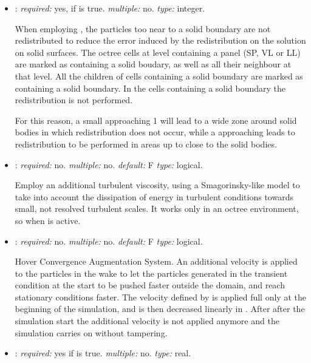 \begin{itemize}
\item {}: \textit{required:} yes, if  is true. \textit{multiple:} no. \textit{type:} integer.

When employing , the particles too near to a solid boundary are not redistributed to reduce the error induced by the redistribution on the solution on solid surfaces. The octree cells at level  containing a panel (SP, VL or LL) are marked as containing a solid boudary, as well as all their neighbour at that level. All the children of cells containing a solid boundary are marked as containing a solid boundary. In the cells containing a solid boundary the redistribution is not performed.

For this reason, a small  approaching 1 will lead to a wide zone around solid bodies in which redistribution does not occur, while a  approaching  leads to redistribution to be performed in areas up to close to the solid bodies.

\item {}: \textit{required:} no. \textit{multiple:} no. \textit{default:} F \textit{type:} logical.

Employ an additional turbulent viscosity, using a Smagorinsky-like model to take into account the dissipation of energy in turbulent conditions towards small, not resolved turbulent scales. It works only in an octree environment, so when  is active.

\item {}: \textit{required:} no. \textit{multiple:} no. \textit{default:} F \textit{type:} logical.

Hover Convergence Augmentation System. An additional velocity is applied to the particles in the wake to let the particles generated in the transient condition at the start to be pushed faster outside the domain, and reach stationary conditions faster. The velocity defined by  is applied full only at the beginning of the simulation, and is then decreased linearly in . After  after the simulation start the additional velocity is not applied anymore and the simulation carries on without tampering. 

\item {}: \textit{required:} yes if  is true. \textit{multiple:} no. \textit{type:} real.


\end{itemize}
